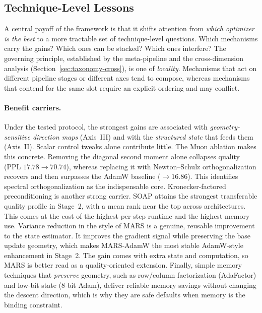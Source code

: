 \subsection{Technique-Level Lessons}
\label{sec:discussion-compositions}

A central payoff of the framework is that it shifts attention from
\emph{which optimizer is the best} to a more tractable set of technique-level
questions. Which mechanisms carry the gains? Which ones can be stacked? Which
ones interfere?
The governing principle, established by the meta-pipeline and the cross-dimension
analysis (Section~\ref{sec:taxonomy-cross}), is one of \emph{locality}.
Mechanisms that act on different pipeline stages or different axes tend to
compose, whereas mechanisms that contend for the same slot require an explicit
ordering and may conflict.

\paragraph{Benefit carriers.}
Under the tested protocol, the strongest gains are associated with
\emph{geometry-sensitive direction maps} (Axis~III) and with the
\emph{structured state} that feeds them (Axis~II). Scalar control tweaks alone
contribute little. The Muon ablation makes this concrete. Removing the
diagonal second moment alone collapses quality (PPL $17.78\!\rightarrow\!70.74$),
whereas replacing it with Newton--Schulz orthogonalization recovers and then
surpasses the AdamW baseline ($\rightarrow\!16.86$). This identifies spectral
orthogonalization as the indispensable core.
Kronecker-factored preconditioning is another strong carrier. SOAP attains
the strongest transferable quality profile in Stage~2, with a mean rank near the
top across architectures. This comes at the cost of the highest per-step runtime
and the highest memory use.
Variance reduction in the style of MARS is a genuine, reusable improvement to the
state estimator. It improves the gradient signal while preserving the base update
geometry, which makes MARS-AdamW the most stable AdamW-style enhancement in
Stage~2. The gain comes with extra state and computation, so MARS is better read
as a quality-oriented extension. Finally, simple
memory techniques that \emph{preserve} geometry, such as row/column
factorization (AdaFactor) and low-bit state (8-bit Adam), deliver
reliable memory savings without changing the descent direction, which is why they
are safe defaults when memory is the binding constraint.

